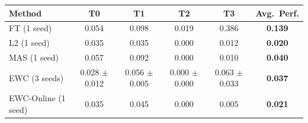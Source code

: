 \begin{tabular}{lcccc|c}
\toprule
Method & T0 & T1 & T2 & T3 & \textbf{Avg.\ Perf.} \\
\midrule
FT (1 seed) & 0.054 & 0.098 & 0.019 & 0.386 & \textbf{0.139} \\
L2 (1 seed) & 0.035 & 0.035 & 0.000 & 0.012 & \textbf{0.020} \\
MAS (1 seed) & 0.057 & 0.092 & 0.000 & 0.010 & \textbf{0.040} \\
EWC (3 seeds) & 0.028 $\pm$ 0.012 & 0.056 $\pm$ 0.005 & 0.000 $\pm$ 0.000 & 0.063 $\pm$ 0.033 & \textbf{0.037} \\
EWC-Online (1 seed) & 0.035 & 0.045 & 0.000 & 0.005 & \textbf{0.021} \\
\bottomrule
\end{tabular}